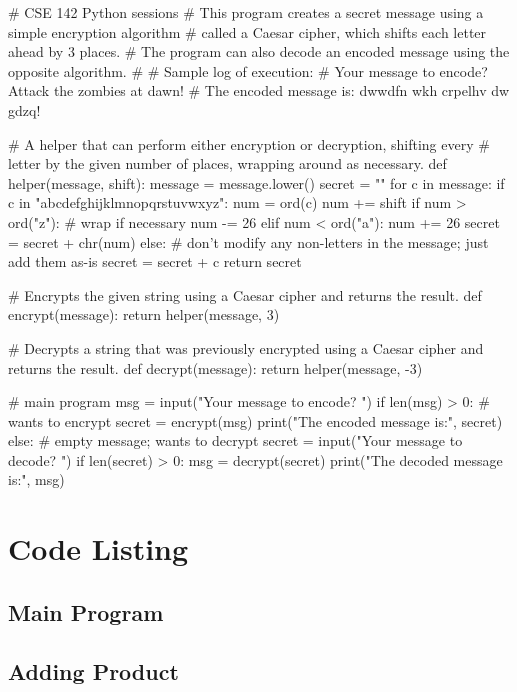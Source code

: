 \begin{python}
# CSE 142 Python sessions
# This program creates a secret message using a simple encryption algorithm
# called a Caesar cipher, which shifts each letter ahead by 3 places.
# The program can also decode an encoded message using the opposite algorithm.
#
# Sample log of execution:
# Your message to encode? Attack the zombies at dawn!
# The encoded message is: dwwdfn wkh crpelhv dw gdzq!

# A helper that can perform either encryption or decryption, shifting every
# letter by the given number of places, wrapping around as necessary.
def helper(message, shift):
	message = message.lower()
	secret = ""
	for c in message:
		if c in "abcdefghijklmnopqrstuvwxyz":
			num = ord(c)
			num += shift
			if num > ord("z"):     # wrap if necessary
				num -= 26
			elif num < ord("a"):
				num += 26
			secret = secret + chr(num)
		else:
			# don't modify any non-letters in the message; just add them as-is
			secret = secret + c
	return secret

# Encrypts the given string using a Caesar cipher and returns the result.
def encrypt(message):
	return helper(message, 3)

# Decrypts a string that was previously encrypted using a Caesar cipher and returns the result.
def decrypt(message):
	return helper(message, -3)


# main program
msg = input("Your message to encode? ")
if len(msg) > 0:
	# wants to encrypt
	secret = encrypt(msg)
	print("The encoded message is:", secret)
else:
	# empty message; wants to decrypt
	secret = input("Your message to decode? ")
	if len(secret) > 0:
		msg = decrypt(secret)
		print("The decoded message is:", msg)

\end{python}


\pagebreak

\section{Code Listing}


\subsection{Main Program}
\pagebreak

\subsection{Adding Product}
\pagebreak


